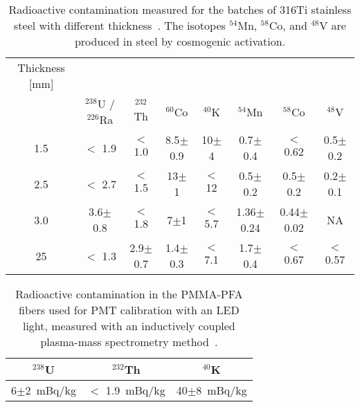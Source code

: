 \begin{table}[!b]
\centering
\caption[Radioactive contamination measured for the batches of 316Ti stainless steel with different thickness]{Radioactive contamination measured for the batches of 316Ti stainless steel with different thickness~\cite{ScreeningPaper}. The isotopes $^{54}$Mn, $^{58}$Co, and $^{48}$V are produced in steel by cosmogenic activation.}
\label{tabStainlessSteelRA}
\begin{tabular}{>{\footnotesize}c|>{\footnotesize}c|>{\footnotesize}c|>{\footnotesize}c|>{\footnotesize}c|>{\footnotesize}c|>{\footnotesize}c|>{\footnotesize}c}
\hline
Thickness [mm] 	& \multicolumn{7}{>{\footnotesize}c}{Radioactive contamination [mBq/kg]} \\
				& $^{238}$U / $^{226}$Ra	& $^{232}$Th 	 	& $^{60}$Co 	 	& $^{40}$K 	& $^{54}$Mn		& $^{58}$Co		& $^{48}$V\\
\hline
1.5 				& $<$ 1.9					& $<$ 1.0  		& 8.5$\pm$0.9		& 10$\pm$4  	& 0.7$\pm$0.4		& $<$0.62			& 0.5$\pm$0.2 \\
2.5 				& $<$ 2.7					& $<$ 1.5			& 13$\pm$1		& $<$ 12  		& 0.5$\pm$0.2		& 0.5$\pm$0.2		& 0.2$\pm$0.1 \\
3.0 				& 3.6$\pm$0.8				& $<$ 1.8			& 7$\pm$1		& $<$ 5.7 		& 1.36$\pm$0.24 	& 0.44$\pm$0.02	& NA \\
25 				& $<$ 1.3					& 2.9$\pm$0.7		& 1.4$\pm$0.3		& $<$ 7.1 		& 1.7$\pm$0.4		& $<$0.67			& $<$0.57 \\
\hline
\end{tabular}
\end{table}

\begin{table}[!b]
\centering
\caption[Radioactive contamination in the PMMA-PFA fibers]{Radioactive contamination in the PMMA-PFA fibers used for PMT calibration with an LED light, measured with an inductively coupled plasma-mass spectrometry method~\cite{ScreeningPaper}.}
\label{tabScreeningFibers}
\begin{tabular}{>{\footnotesize}c|>{\footnotesize}c|>{\footnotesize}c}
\hline
$^{238}$U			& $^{232}$Th 	 		& $^{40}$K \\
\hline
6$\pm$2~mBq/kg		& $<$ 1.9~mBq/kg 		& 40$\pm$8~mBq/kg  	\\
\hline
\end{tabular}
\end{table}

